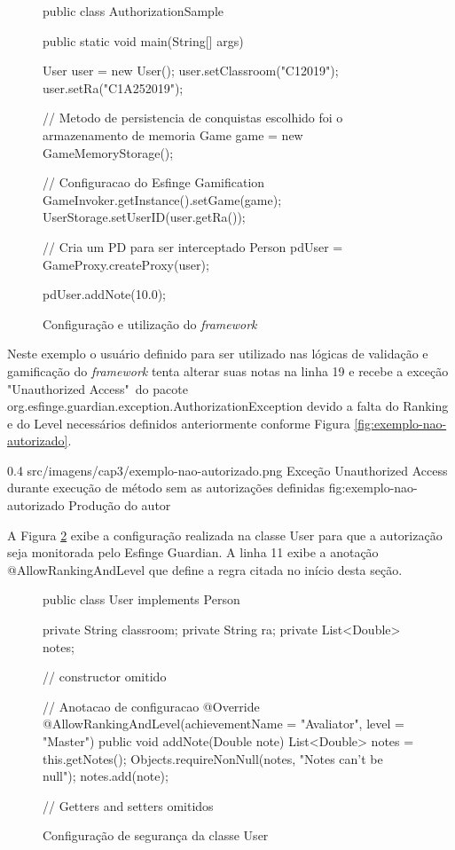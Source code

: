 \begin{figure}[H]
    \centering
    \caption{Configuração e utilização do \textit{framework}}
    \begin{java}
public class AuthorizationSample {

	public static void main(String[] args) {

		User user = new User();
		user.setClassroom("C12019");
		user.setRa("C1A252019");
		
		// Metodo de persistencia de conquistas escolhido foi o armazenamento de memoria
		Game game = new GameMemoryStorage();

		// Configuracao do Esfinge Gamification
		GameInvoker.getInstance().setGame(game);
		UserStorage.setUserID(user.getRa());

		// Cria um PD para ser interceptado
		Person pdUser = GameProxy.createProxy(user);

		pdUser.addNote(10.0);

	}
}
    \end{java}
    \label{fig:hellow-world-gamification}
\end{figure}

\par Neste exemplo o usuário definido para ser utilizado nas lógicas de validação e gamificação do \textit{framework} tenta alterar suas notas na linha 19 e recebe a exceção "Unauthorized Access"\ do pacote org.esfinge.guardian.exception.AuthorizationException devido a falta do Ranking e do Level necessários definidos anteriormente conforme Figura \ref{fig:exemplo-nao-autorizado}.

\begin{image}
{0.4}
{src/imagens/cap3/exemplo-nao-autorizado.png}
{Exceção Unauthorized Access durante execução de método sem as autorizações definidas}
{fig:exemplo-nao-autorizado}
{Produção do autor}
\end{image}

\par A Figura \ref{fig:execao-configuracao} exibe a configuração realizada na classe User para que a autorização seja monitorada pelo Esfinge Guardian. A linha 11 exibe a anotação @AllowRankingAndLevel que define a regra citada no início desta seção.

\begin{figure}[H]
    \centering
    \caption{Configuração de segurança da classe User}
    \begin{java}
public class User implements Person {

	private String classroom;
	private String ra;
	private List<Double> notes;

// constructor omitido
    
// Anotacao de configuracao
        @Override
	@AllowRankingAndLevel(achievementName = "Avaliator", level = "Master")
	public void addNote(Double note) {
		List<Double> notes = this.getNotes();
		Objects.requireNonNull(notes, "Notes can't be null");
		notes.add(note);
	}
	
// Getters and setters omitidos
}
    \end{java}
    \label{fig:execao-configuracao}
\end{figure}

